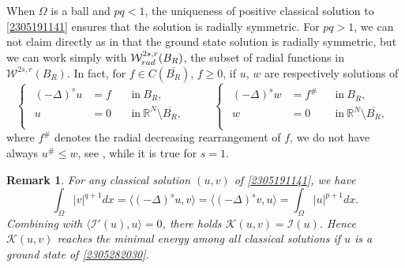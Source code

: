 \documentclass[10pt]{article}
\numberwithin{equation}{section}
\newtheorem{remark}[theorem]{Remark}
\numberwithin{equation}{section}
\begin{document}
When $\Omega$ is a ball and $pq<1$, the uniqueness of positive classical solution to \eqref{2305191141} ensures that the solution is radially symmetric. For $pq>1$, we can not claim directly as in \cite{BMR2012} that the ground state solution is radially symmetric, but we can work simply with $\mathcal{W}_{{\rm rad}}^{2s, r}(B_R)$, the subset of radial functions in $\mathcal{W}^{2s, r}(B_R)$. In fact, for $f\in C(\overline{B_R})$, $f\ge 0$, if $u$, $w$ are respectively solutions of
 \begin{equation*}
\begin{cases}
\begin{aligned}
(-\Delta)^{s} u&=f &&\text{in}~ B_R,\\
u&=0~&&\text{in} ~ \mathbb{R}^N\setminus\overline{B_R},\\
\end{aligned}
\end{cases}
\quad\quad
\begin{cases}
\begin{aligned}
(-\Delta)^{s} w&=f^{\#} &&\text{in}~B_R,\\
w&=0~&&\text{in} ~ \mathbb{R}^N\setminus\overline{B_R},\\
\end{aligned}
\end{cases}
\end{equation*}
where $f^{\#}$ denotes the radial decreasing rearrangement of $f$, we do not have always $u^{\#}\le w$, see \cite{FV2021}, while it is true for $s=1$. 


\begin{remark}
For any classical solution $(u, v)$ of \eqref{2305191141}, we have
\[
\int_{\Omega}|v|^{q+1} dx=\langle (-\Delta)^s u, v \rangle=\langle (-\Delta)^s v, u \rangle=\int_{\Omega}|u|^{p+1} dx.
\]
Combining with $\langle \mathcal{I}'(u), u\rangle=0$, there holds
$\mathcal{K}(u, v)=\mathcal{I}(u)$. Hence $\mathcal{K}(u, v)$ reaches the minimal energy among all classical solutions if $u$ is a ground state of \eqref{2305282030}.
\end{remark}
\end{document}
